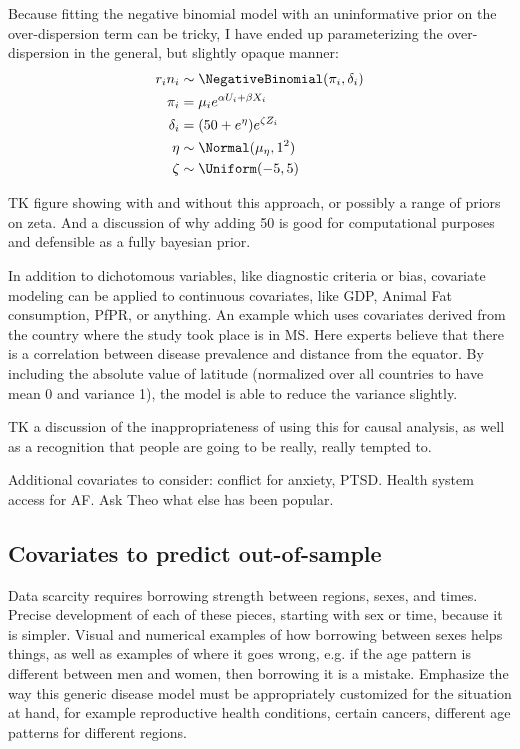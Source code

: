 Because fitting the negative binomial model with an uninformative
prior on the over-dispersion term can be tricky, I have ended up
parameterizing the over-dispersion in the general, but slightly opaque manner:
\begin{align*}
r_i n_i &\sim \NegativeBinomial(\pi_i, \delta_i)\\
\pi_i &= \mu_i e^{\alpha U_i + \beta X_i}\\
\delta_i &= (50 + e^\eta)e^{\zeta Z_i}\\
\eta &\sim \Normal(\mu_\eta, 1^2)\\
\zeta &\sim \Uniform(-5, 5)
\end{align*}

TK figure showing with and without this approach, or possibly a range
of priors on zeta. And a discussion of why adding 50 is good for
computational purposes and defensible as a fully bayesian prior.

In addition to dichotomous variables, like diagnostic criteria or
bias, covariate modeling can be applied to continuous covariates, like
GDP, Animal Fat consumption, PfPR, or anything.  An example which uses
covariates derived from the country where the study took place is in
MS.  Here experts believe that there is a correlation between disease
prevalence and distance from the equator.  By including the absolute
value of latitude (normalized over all countries to have mean 0 and
variance 1), the model is able to reduce the variance slightly.

TK a discussion of the inappropriateness of using this for causal
analysis, as well as a recognition that people are going to be really,
really tempted to.

Additional covariates to consider: conflict for anxiety, PTSD. Health
system access for AF.  Ask Theo what else has been popular.

\subsection{Covariates to predict out-of-sample}

Data scarcity requires borrowing strength between regions, sexes, and
times. Precise development of each of these pieces, starting with sex
or time, because it is simpler. Visual and numerical examples of how
borrowing between sexes helps things, as well as examples of where it
goes wrong, e.g. if the age pattern is different between men and
women, then borrowing it is a mistake. Emphasize the way this generic
disease model must be appropriately customized for the situation at
hand, for example reproductive health conditions, certain cancers,
different age patterns for different regions.

